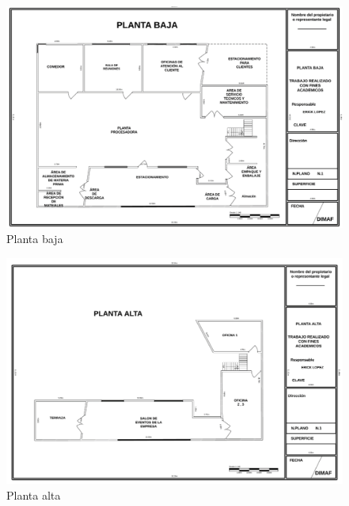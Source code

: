 



\begin{figure}[H]
    \centering	
    \includegraphics[angle=90,width=1.0\textwidth]{chapters/image1_.png} 
    \caption{Planta baja}
\label{fig:croquis190125}
\end{figure}

\begin{figure}[H]
    \centering	
    \includegraphics[angle=90,width=1.0\textwidth]{chapters/image2_.png} 
    \caption{Planta alta}
\label{fig:croquis190125}
\end{figure}

